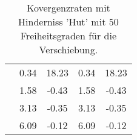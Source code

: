 \begin{table}
\begin{tabular}{c|cc|cc|}
\multicolumn{1}{|c|}{} & \multicolumn{1}{|c|}{      0.34} & \multicolumn{1}{|c|}{     18.23} & \multicolumn{1}{|c|}{      0.34} & \multicolumn{1}{|c|}{     18.23} \\ 
\multicolumn{1}{|c|}{} & \multicolumn{1}{|c|}{      1.58} & \multicolumn{1}{|c|}{     -0.43} & \multicolumn{1}{|c|}{      1.58} & \multicolumn{1}{|c|}{     -0.43} \\ 
\multicolumn{1}{|c|}{} & \multicolumn{1}{|c|}{      3.13} & \multicolumn{1}{|c|}{     -0.35} & \multicolumn{1}{|c|}{      3.13} & \multicolumn{1}{|c|}{     -0.35} \\ 
\multicolumn{1}{|c|}{} & \multicolumn{1}{|c|}{      6.09} & \multicolumn{1}{|c|}{     -0.12} & \multicolumn{1}{|c|}{      6.09} & \multicolumn{1}{|c|}{     -0.12} \\ 
\hline 
\end{tabular}\caption{Kovergenzraten mit Hinderniss 'Hut' mit 50 Freiheitsgraden für die Verschiebung.}\label{tab:Rate_Hut_level1}
\end{table} 
